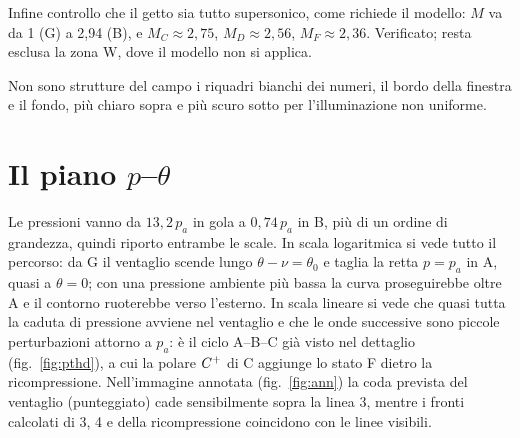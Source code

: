 Infine controllo che il getto sia tutto supersonico, come richiede il modello: $M$ va da 1 (G) a 2,94 (B), e
$M_C\approx2{,}75$, $M_D\approx2{,}56$, $M_F\approx2{,}36$. Verificato; resta esclusa la zona W, dove il modello non si
applica.

Non sono strutture del campo i riquadri bianchi dei numeri, il bordo della finestra e il fondo, più chiaro sopra e più
scuro sotto per l'illuminazione non uniforme.

\section*{Il piano $p$--$\theta$}
Le pressioni vanno da $13{,}2\,p_a$ in gola a $0{,}74\,p_a$ in B, più di un ordine di grandezza, quindi riporto entrambe
le scale. In scala logaritmica si vede tutto il percorso: da G il ventaglio scende lungo $\theta-\nu=\theta_0$ e taglia
la retta $p=p_a$ in A, quasi a $\theta=0$; con una pressione ambiente più bassa la curva proseguirebbe oltre A e il
contorno ruoterebbe verso l'esterno. In scala lineare si vede che quasi tutta la caduta di pressione avviene nel
ventaglio e che le onde successive sono piccole perturbazioni attorno a $p_a$: è il ciclo A--B--C già visto nel
dettaglio (fig.~\ref{fig:pthd}), a cui la polare $C^{+}$ di C aggiunge lo stato F dietro la ricompressione. Nell'immagine annotata (fig.~\ref{fig:ann})
la coda prevista del ventaglio (punteggiato) cade sensibilmente sopra la linea 3, mentre i fronti calcolati di 3, 4 e
della ricompressione coincidono con le linee visibili.

